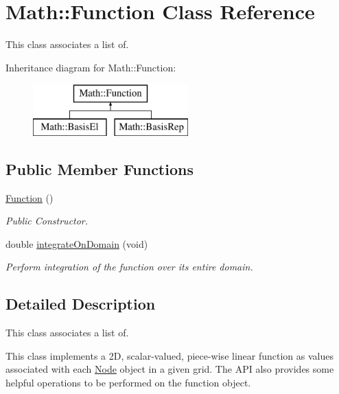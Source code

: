 \hypertarget{class_math_1_1_function}{}\section{Math\+:\+:Function Class Reference}
\label{class_math_1_1_function}


This class associates a list of.  


Inheritance diagram for Math\+:\+:Function\+:\begin{figure}[H]
\begin{center}
\leavevmode
\includegraphics[height=2.000000cm]{class_math_1_1_function}
\end{center}
\end{figure}
\subsection*{Public Member Functions}
\begin{DoxyCompactItemize}
\item 
\mbox{\hyperlink{class_math_1_1_function_a97e51108b0374f8adc7982f92af4d0de}{Function}} ()
\begin{DoxyCompactList}\small\item\em Public Constructor. \end{DoxyCompactList}\item 
double \mbox{\hyperlink{class_math_1_1_function_ad85e716accc64c1ea4962c828c4e216c}{integrate\+On\+Domain}} (void)
\begin{DoxyCompactList}\small\item\em Perform integration of the function over its entire domain. \end{DoxyCompactList}\end{DoxyCompactItemize}


\subsection{Detailed Description}
This class associates a list of. 

This class implements a 2D, scalar-\/valued, piece-\/wise linear function as values associated with each \mbox{\hyperlink{class_node}{Node}} object in a given grid. The A\+PI also provides some helpful operations to be performed on the function object. 

